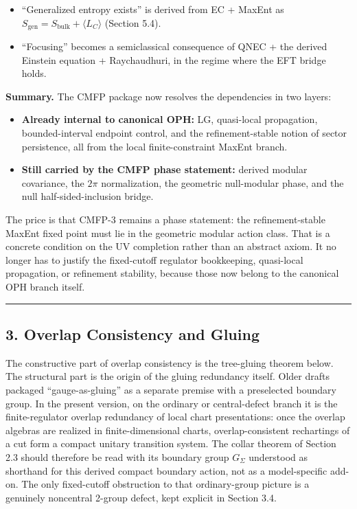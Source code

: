\begin{itemize}
\item
``Generalized entropy exists'' is derived from EC + MaxEnt as \(S_{\mathrm{gen}} = S_{\mathrm{bulk}} + \langle L_C \rangle\) (Section 5.4).
\item
``Focusing'' becomes a semiclassical consequence of QNEC + the derived Einstein equation + Raychaudhuri, in the regime where the EFT bridge holds.
\end{itemize}

\textbf{Summary.} The CMFP package now resolves the dependencies in two layers:

\begin{itemize}
\tightlist
\item
\textbf{Already internal to canonical OPH:} LG, quasi-local propagation, bounded-interval endpoint control, and the refinement-stable notion of sector persistence, all from the local finite-constraint MaxEnt branch.
\item
\textbf{Still carried by the CMFP phase statement:} derived modular covariance, the \(2\pi\) normalization, the geometric null-modular phase, and the null half-sided-inclusion bridge.
\end{itemize}

The price is that CMFP-3 remains a phase statement: the refinement-stable MaxEnt fixed point must lie in the geometric modular action class. That is a concrete condition on the UV completion rather than an abstract axiom. It no longer has to justify the fixed-cutoff regulator bookkeeping, quasi-local propagation, or refinement stability, because those now belong to the canonical OPH branch itself.

\begin{center}\rule{0.5\linewidth}{0.5pt}\end{center}

\subsection{3. Overlap Consistency and Gluing}\label{3-overlap-consistency-and-gluing}

The constructive part of overlap consistency is the tree-gluing theorem below. The structural part is the origin of the gluing redundancy itself. Older drafts packaged ``gauge-as-gluing'' as a separate premise with a preselected boundary group. In the present version, on the ordinary or central-defect branch it is the finite-regulator overlap redundancy of local chart presentations: once the overlap algebras are realized in finite-dimensional charts, overlap-consistent rechartings of a cut form a compact unitary transition system. The collar theorem of Section 2.3 should therefore be read with its boundary group \(G_\Sigma\) understood as shorthand for this derived compact boundary action, not as a model-specific add-on. The only fixed-cutoff obstruction to that ordinary-group picture is a genuinely noncentral 2-group defect, kept explicit in Section 3.4.

